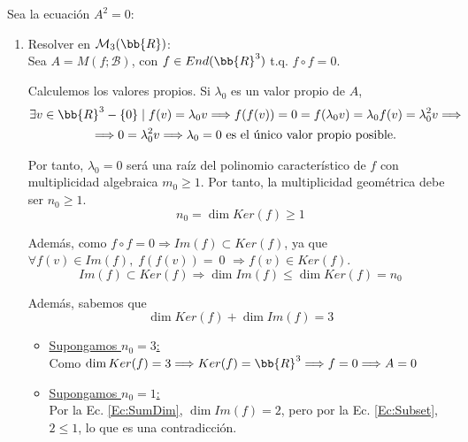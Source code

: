 \begin{ejercicio}
    Sea la ecuación $A^2=0$:
    \begin{enumerate}
        \item Resolver en $\mathcal{M}_3(\bb{R})$:\\
        Sea $A=M(f;\mathcal{B})$, con $f\in End(\bb{R}^3)$ t.q. $f\circ f = 0$.

        Calculemos los valores propios. Si $\lambda_0$ es un valor propio de $A$, \begin{multline*}
            \exists v\in \bb{R}^3-\{0\} \mid f(v) = \lambda_0 v \Longrightarrow f(f(v)) = 0 = f(\lambda_0v) = \lambda_0f(v) = \lambda_0^2v\Longrightarrow \\ \Longrightarrow 0=\lambda_0^2v \Longrightarrow \lambda_0 = 0 \text{ es el único valor propio posible.}
        \end{multline*}
    
        Por tanto, $\lambda_0=0$ será una raíz del polinomio característico de $f$ con multiplicidad algebraica $m_0 \geq 1$. Por tanto, la multiplicidad geométrica debe ser $n_0\geq 1$.
        \begin{equation}
            n_0 = \dim Ker(f) \geq 1
        \end{equation}
        
        Además, como $f\circ f = 0 \Longrightarrow Im(f) \subset Ker(f)$, ya que $\forall  f(v) \in Im(f),\; f(f(v))=~0$ $ \Longrightarrow f(v) \in Ker(f)$.
        \begin{equation}\label{Ec:Subset}
            Im(f) \subset Ker(f) \Longrightarrow \dim Im(f) \leq \dim Ker(f) = n_0
        \end{equation}
        
       Además, sabemos que
       \begin{equation}\label{Ec:SumDim}
           \dim Ker(f) + \dim Im(f) = 3
       \end{equation}
    
       \begin{itemize}
           \item \underline{Supongamos $n_0 = 3$:}\\
           Como $\dim Ker(f)=3 \Longrightarrow Ker(f) = \bb{R}^3 \Longrightarrow f=0 \Longrightarrow A=0$
    
           \item \underline{Supongamos $n_0 = 1$:}\\
           Por la Ec. \ref{Ec:SumDim}, $\dim Im(f)=2$, pero por la Ec. \ref{Ec:Subset}, $2\leq 1$, lo que es una contradicción.
    

\end{itemize}
\end{enumerate}
\end{ejercicio}

